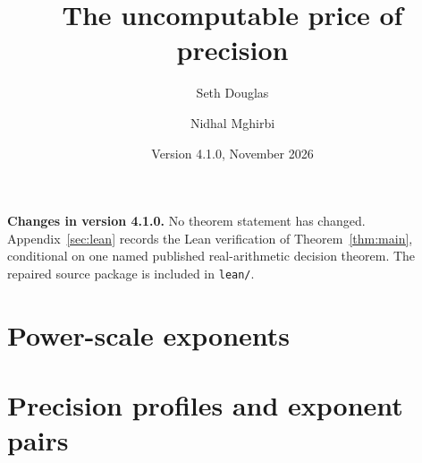 \documentclass[11pt,a4paper]{article}
\title{The uncomputable price of precision}
\author{Seth Douglas \and Nidhal Mghirbi}
\date{Version 4.1.0, November 2026}
\theoremstyle{plain}
\theoremstyle{definition}
\theoremstyle{remark}
\numberwithin{equation}{section}
\begin{document}
\maketitle

\begin{center}\small
\begin{minipage}{0.92\linewidth}
\textbf{Changes in version 4.1.0.} No theorem statement has changed. Appendix~\ref{sec:lean} records the Lean verification of Theorem~\ref{thm:main}, conditional on one named published real-arithmetic decision theorem. The repaired source package is included in \texttt{lean/}.
\end{minipage}
\end{center}
\clearpage
{\small\setcounter{tocdepth}{1}\tableofcontents}
\clearpage















\clearpage

\clearpage
\part*{Power-scale exponents}
\setcounter{section}{0}
\renewcommand{\thesection}{P\arabic{section}}
\renewcommand{\theHsection}{power.\arabic{section}}









\clearpage
\part*{Precision profiles and exponent pairs}
\setcounter{section}{0}
\renewcommand{\thesection}{Q\arabic{section}}
\renewcommand{\theHsection}{profiles.\arabic{section}}







\clearpage
\setcounter{section}{16}
\renewcommand{\thesection}{\arabic{section}}
\renewcommand{\theHsection}{\arabic{section}}


\appendix


\begingroup

\endgroup
\begingroup

\endgroup


\end{document}
